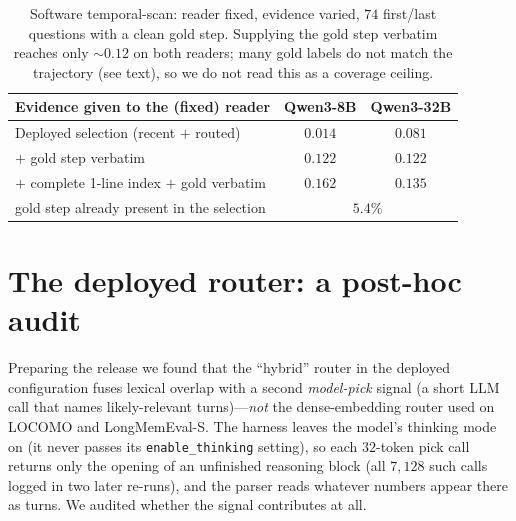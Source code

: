 \documentclass{article} %
\begin{document}
\begin{table}[h]
\centering
\caption{Software temporal-scan: reader fixed, evidence varied, $74$
first/last questions with a clean gold step. Supplying the gold step verbatim reaches
only $\sim\!0.12$ on both readers; many gold labels do not match the trajectory
(see text), so we do not read this as a coverage ceiling.}
\label{tab:swmech}
\small
\begin{tabular}{lcc}
\toprule
Evidence given to the (fixed) reader & Qwen3-8B & Qwen3-32B \\
\midrule
Deployed selection (recent $+$ routed) & $0.014$ & $0.081$ \\
\quad $+$ gold step verbatim & $0.122$ & $0.122$ \\
\quad $+$ complete 1-line index $+$ gold verbatim & $0.162$ & $0.135$ \\
\midrule
gold step already present in the selection & \multicolumn{2}{c}{$5.4\%$} \\
\bottomrule
\end{tabular}
\end{table}

\section{The deployed router: a post-hoc audit}
\label{app:routeraudit}

Preparing the release we found that the ``hybrid'' router in the deployed
configuration fuses lexical overlap with a second \emph{model-pick} signal (a short
LLM call that names likely-relevant turns)---\emph{not} the dense-embedding router
used on LOCOMO and LongMemEval-S. The harness leaves the model's thinking mode on (it never passes its \texttt{enable\_thinking} setting), so each $32$-token pick call
returns only the opening of an unfinished reasoning block (all $7{,}128$ such calls logged in two later re-runs), and the parser reads whatever numbers appear there as turns. We audited whether the signal contributes at all.
\end{document}
